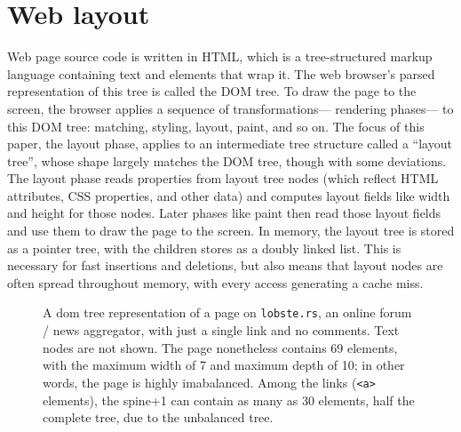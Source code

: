 
\section{Web layout}

Web page source code is written in HTML,
  which is a tree-structured markup language
  containing text and elements that wrap it.
The web browser's parsed representation of this tree
  is called the DOM tree.
To draw the page to the screen,
  the browser applies a sequence of transformations---%
  rendering phases---%
  to this DOM tree: matching, styling, layout, paint, and so on.
The focus of this paper, the layout phase,
  applies to an intermediate tree structure
  called a ``layout tree'',
  whose shape largely matches the DOM tree,
  though with some deviations.
The layout phase reads properties from layout tree nodes
  (which reflect HTML attributes, CSS properties, and other data)
  and computes layout fields like width and height for those nodes.
Later phases like paint then read those layout fields
  and use them to draw the page to the screen.
In memory,
  the layout tree is stored as a pointer tree,
  with the children stores as a doubly linked list.
This is necessary for fast insertions and deletions,
  but also means that layout nodes are
  often spread throughout memory,
  with every access generating a cache miss.


\begin{figure}
\centering
\caption{A dom tree representation
  of a page on \texttt{lobste.rs},
  an online forum / news aggregator,
  with just a single link and no comments.
Text nodes are not shown.
The page nonetheless contains 69 elements,
  with the maximum width of 7 and maximum depth of 10;
  in other words, the page is highly imabalanced.
Among the links (\texttt{<a>} elements),
  the spine+1 can contain as many as 30 elements, half the complete tree,
  due to the unbalanced tree.
  }
\label{fig:dom-tree-raw}
\end{figure}

